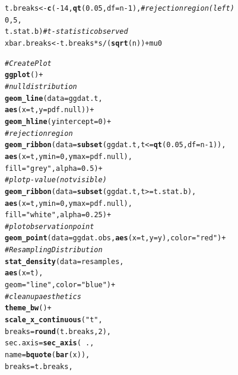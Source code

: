 \documentclass{article}\usepackage[]{graphicx}\usepackage[]{xcolor}
\makeatletter
\newcommand{\hlnum}[1]{\textcolor[rgb]{0.686,0.059,0.569}{#1}}%
\newcommand{\hlsng}[1]{\textcolor[rgb]{0.192,0.494,0.8}{#1}}%
\newcommand{\hlcom}[1]{\textcolor[rgb]{0.678,0.584,0.686}{\textit{#1}}}%
\newcommand{\hlopt}[1]{\textcolor[rgb]{0,0,0}{#1}}%
\newcommand{\hldef}[1]{\textcolor[rgb]{0.345,0.345,0.345}{#1}}%
\newcommand{\hlkwb}[1]{\textcolor[rgb]{0.69,0.353,0.396}{#1}}%
\newcommand{\hlkwc}[1]{\textcolor[rgb]{0.333,0.667,0.333}{#1}}%
\newcommand{\hlkwd}[1]{\textcolor[rgb]{0.737,0.353,0.396}{\textbf{#1}}}%
\newenvironment{kframe}{%
 \def\at@end@of@kframe{}%
 \ifinner\ifhmode%
  \def\at@end@of@kframe{\end{minipage}}%
  \begin{minipage}{\columnwidth}%
 \fi\fi%
 \def\FrameCommand##1{\hskip\@totalleftmargin \hskip-\fboxsep
 \colorbox{shadecolor}{##1}\hskip-\fboxsep
     \hskip-\linewidth \hskip-\@totalleftmargin \hskip\columnwidth}%
 \MakeFramed {\advance\hsize-\width
   \@totalleftmargin\z@ \linewidth\hsize
   \@setminipage}}%
 {\par\unskip\endMakeFramed%
 \at@end@of@kframe}
\newenvironment{knitrout}{}{} %
\makeatother
\begin{document}
\begin{enumerate}
\begin{enumerate}
\begin{knitrout}
\begin{kframe}
\begin{alltt}
\hldef{t.breaks} \hlkwb{<-} \hlkwd{c}\hldef{(}\hlopt{-}\hlnum{14}\hldef{,} \hlkwd{qt}\hldef{(}\hlnum{0.05}\hldef{,} \hlkwc{df} \hldef{= n}\hlopt{-}\hlnum{1}\hldef{),} \hlcom{# rejection region (left)}
              \hlnum{0}\hldef{,} \hlnum{5}\hldef{,}
              \hldef{t.stat.b)}                  \hlcom{# t-statistic observed}
\hldef{xbar.breaks} \hlkwb{<-} \hldef{t.breaks} \hlopt{*} \hldef{s}\hlopt{/}\hldef{(}\hlkwd{sqrt}\hldef{(n))} \hlopt{+} \hldef{mu0}

\hlcom{# Create Plot}
\hlkwd{ggplot}\hldef{()} \hlopt{+}
  \hlcom{# null distribution}
  \hlkwd{geom_line}\hldef{(}\hlkwc{data}\hldef{=ggdat.t,}
            \hlkwd{aes}\hldef{(}\hlkwc{x}\hldef{=t,} \hlkwc{y}\hldef{=pdf.null))}\hlopt{+}
  \hlkwd{geom_hline}\hldef{(}\hlkwc{yintercept}\hldef{=}\hlnum{0}\hldef{)}\hlopt{+}
  \hlcom{# rejection region}
  \hlkwd{geom_ribbon}\hldef{(}\hlkwc{data}\hldef{=}\hlkwd{subset}\hldef{(ggdat.t, t}\hlopt{<=}\hlkwd{qt}\hldef{(}\hlnum{0.05}\hldef{,} \hlkwc{df}\hldef{=n}\hlopt{-}\hlnum{1}\hldef{)),}
              \hlkwd{aes}\hldef{(}\hlkwc{x}\hldef{=t,} \hlkwc{ymin}\hldef{=}\hlnum{0}\hldef{,} \hlkwc{ymax}\hldef{=pdf.null),}
              \hlkwc{fill}\hldef{=}\hlsng{"grey"}\hldef{,} \hlkwc{alpha}\hldef{=}\hlnum{0.5}\hldef{)}\hlopt{+}
  \hlcom{# plot p-value (not visible)}
  \hlkwd{geom_ribbon}\hldef{(}\hlkwc{data}\hldef{=}\hlkwd{subset}\hldef{(ggdat.t, t}\hlopt{>=}\hldef{t.stat.b),}
              \hlkwd{aes}\hldef{(}\hlkwc{x}\hldef{=t,} \hlkwc{ymin}\hldef{=}\hlnum{0}\hldef{,} \hlkwc{ymax}\hldef{=pdf.null),}
              \hlkwc{fill}\hldef{=}\hlsng{"white"}\hldef{,} \hlkwc{alpha}\hldef{=}\hlnum{0.25}\hldef{)}\hlopt{+}
  \hlcom{# plot observation point}
  \hlkwd{geom_point}\hldef{(}\hlkwc{data}\hldef{=ggdat.obs,} \hlkwd{aes}\hldef{(}\hlkwc{x}\hldef{=t,} \hlkwc{y}\hldef{=y),} \hlkwc{color}\hldef{=}\hlsng{"red"}\hldef{)}\hlopt{+}
  \hlcom{# Resampling Distribution}
  \hlkwd{stat_density}\hldef{(}\hlkwc{data}\hldef{=resamples,}
               \hlkwd{aes}\hldef{(}\hlkwc{x}\hldef{=t),}
               \hlkwc{geom}\hldef{=}\hlsng{"line"}\hldef{,} \hlkwc{color}\hldef{=}\hlsng{"blue"}\hldef{)}\hlopt{+}
  \hlcom{# clean up aesthetics}
  \hlkwd{theme_bw}\hldef{()}\hlopt{+}
  \hlkwd{scale_x_continuous}\hldef{(}\hlsng{"t"}\hldef{,}
                     \hlkwc{breaks} \hldef{=} \hlkwd{round}\hldef{(t.breaks,}\hlnum{2}\hldef{),}
                     \hlkwc{sec.axis} \hldef{=} \hlkwd{sec_axis}\hldef{(}\hlopt{~}\hldef{.,}
                                         \hlkwc{name} \hldef{=} \hlkwd{bquote}\hldef{(}\hlkwd{bar}\hldef{(x)),}
                                         \hlkwc{breaks} \hldef{= t.breaks,}

\end{alltt}
\end{kframe}
\end{knitrout}
\end{enumerate}
\end{enumerate}
\end{document}
